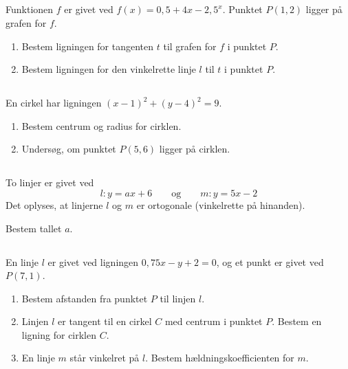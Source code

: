 \documentclass[10pt,a4paper,table]{article}
\begin{document}
\subsection{}

Funktionen $f$ er givet ved $f(x) = 0{,}5 + 4x - 2{,}5^x$. Punktet $P(1, 2)$ ligger på grafen for $f$.

\begin{enumerate}
  \item Bestem ligningen for tangenten $t$ til grafen for $f$ i punktet $P$.
  \item Bestem ligningen for den vinkelrette linje $l$ til $t$ i punktet $P$.
\end{enumerate}


\subsection{}

En cirkel har ligningen $(x-1)^2 + (y-4)^2 = 9$.

\begin{enumerate}
  \item Bestem centrum og radius for cirklen.
  \item Undersøg, om punktet $P(5, 6)$ ligger på cirklen.
\end{enumerate}


\subsection{}

To linjer er givet ved
\[
  l: y = ax + 6 \qquad \text{og} \qquad m: y = 5x - 2
\]
Det oplyses, at linjerne $l$ og $m$ er ortogonale (vinkelrette på hinanden).

Bestem tallet $a$.


\subsection{}

En linje $l$ er givet ved ligningen $0{,}75x - y + 2 = 0$, og et punkt er givet ved $P(7, 1)$.

\begin{enumerate}
  \item Bestem afstanden fra punktet $P$ til linjen $l$.
  \item Linjen $l$ er tangent til en cirkel $C$ med centrum i punktet $P$. Bestem en ligning for cirklen $C$.
  \item En linje $m$ står vinkelret på $l$. Bestem hældningskoefficienten for $m$.
\end{enumerate}
\end{document}

